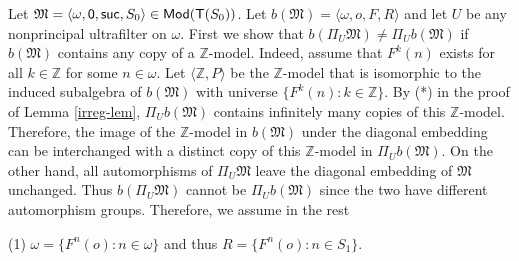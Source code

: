 \documentclass[12pt,leqno]{article}
\newcommand{\comment}[1]{}
\newcommand{\de}{\mbox{\ :=\ }}
\newcommand{\Mm}{\mbox{$\mathfrak M$}}
\newcommand{\T}{\mbox{\sf T}}
\newcommand{\Mod}{\mbox{\sf Mod}}
\newcommand{\Z}{\mathbb Z}
\newcommand{\zero}{\mbox{\sf 0}}
\newcommand{\suc}{\mbox{\sf suc}}
\begin{document}
Let $\Mm=\langle\omega,\zero,\suc,S_0\rangle\in\Mod(\T(S_0))$.  Let $b(\Mm)=\langle\omega,o,F,R\rangle$ and let $U$ be any nonprincipal ultrafilter on $\omega$. First we show that $b(\Pi_U\Mm)\ne\Pi_U b(\Mm)$ if $b(\Mm)$ contains any copy of a $\Z$-model. Indeed, assume that $F^k(n)$ exists for all $k\in\Z$ for some $n\in\omega$. Let $\langle\Z,P\rangle$ be the $\Z$-model that is isomorphic to the induced subalgebra of $b(\Mm)$ with universe $\{ F^k(n) : k\in\Z\}$.  By (*) in the proof of Lemma \ref{irreg-lem}, $\Pi_U b(\Mm)$ contains infinitely many copies of this $\Z$-model. Therefore, the image of the $\Z$-model in $b(\Mm)$ under the diagonal embedding can be interchanged with a distinct copy of this $\Z$-model in $\Pi_U b(\Mm)$. On the other hand, all automorphisms of $\Pi_U\Mm$ leave the diagonal embedding of $\Mm$ unchanged.  Thus $b(\Pi_U\Mm)$ cannot be $\Pi_Ub(\Mm)$ since the two have different automorphism groups. Therefore, we assume in the rest
%
\begin{description}\label{1}
\item{(1)} $\omega=\{ F^n(o) : n\in\omega\}$  and thus $R=\{ F^n(o) : n\in S_1\}$.	
\end{description}
%
\comment{Next we show that $b(\Pi_U\Mm)\ne\Pi_U b(\Mm)$ if there are infinitely many jumps in $F$, i.e., if 
\[J\de\{ k\in\Z : F(y)=\suc^k(y)\mbox{ for some }y\in\omega\}\]
 is infinite. Indeed, for all $k\in J$ let $y_k$ be such that $F(y_k)=\suc^k(y_k)$. Let $f:J\to\omega$ be any bijection (there is such because $J$ is countably infinite) and let $y\de\langle y_{k} : f(k)\in\omega\rangle$. Then $y$ is an $\omega$-sequence, namely $y:\omega\to\omega$, so $y_U\in\Pi_U\omega$. Further, $F(y_U)$ is not in the copy of the $\Z$-model containing $y_U$ in $\Pi_U\Mm$,  i.e., $F(y_U)\ne\suc^k(y_U)$ for all $k\in\Z$, by the definition of $J$. Choose an automorphism of $\Pi_U\Mm$ that interchanges the copy of the $\Z$-model containing $y_U$ with another copy that does not contain either $y_U$ or $F(y_U)$. There is such an automorphism by (*) in the proof of Lemma \ref{irreg-lem}. Now, this is not an automorphism of $\Pi_Ub(\Mm)$ since $F$ is one-to-one in $b(\Mm)$ (by $b(\Mm)\in\Mod(\T(S_1))$). Therefore, we assume in the rest}
\end{document}
